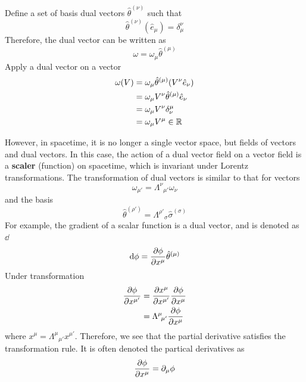\documentclass[11pt]{article}
\theoremstyle{definition}
\numberwithin{equation}{section}
\begin{document}
Define a set of basis dual vectors $\hat\theta^{(\nu)}$ such that 
\begin{equation}
    \hat\theta^{(\nu)}(\hat e_{\mu})=\delta_\mu^\nu
    \label{eq:1-2-1}
\end{equation}
Therefore, the dual vector can be written as 
\begin{equation}
    \omega=\omega_\mu \hat\theta^{(\mu)}
\end{equation}
Apply a dual vector on a vector 
\begin{equation}
    \begin{aligned}
        \omega(V)&=\omega_\mu \hat\theta^{(\mu)}\qty(V^\nu \hat e_{\nu})\\
        &=\omega_\mu V^\nu \hat\theta^{(\mu)}\hat e_{\nu}\\
        &=\omega_\mu V^\nu \delta_\nu^\mu\\
        &=\omega_\mu V^\mu \in \mathbb{R}
    \end{aligned}
\end{equation}

However, in spacetime, it is no longer a single vector space, but fields of vectors and dual vectors. In this case, the action of a dual vector field on a vector field is a \textbf{scaler} (function) on spacetime, which is invariant under Lorentz transformations. The transformation of dual vectors is similar to that for vectors
\begin{equation}
    \omega_{\mu'} = \Lambda^\nu \!_{\mu'}\omega_\nu
\end{equation}
and the basis 
\begin{equation}
    \hat\theta^{(\rho')}=\Lambda^{\rho'} \!_\sigma\hat\sigma^{(\sigma)}
\end{equation}
For example, the gradient of a scalar function is a dual vector, and is denoted as $\dd$
\begin{equation}
    \dd \phi=\pdv{\phi}{x^\mu}\hat\theta^{(\mu)}
\end{equation}
Under transformation 
\begin{equation}
    \begin{aligned}
        \pdv{\phi}{x^{\mu'}} &=\pdv{x^\mu}{x^{\mu'}}\pdv{\phi}{x^\mu}\\
        &=\Lambda^\mu \!_{\mu'}\pdv{\phi}{x^\mu}
    \end{aligned}
\end{equation}
where $x^\mu = \Lambda^\mu \!_{\mu'}x^{\mu'}$. Therefore, we see that the partial derivative satisfies the transformation rule. It is often denoted the partical derivatives as 
\begin{equation}
    \pdv{\phi}{x^\mu}=\partial_\mu\phi
\end{equation}
\end{document}
